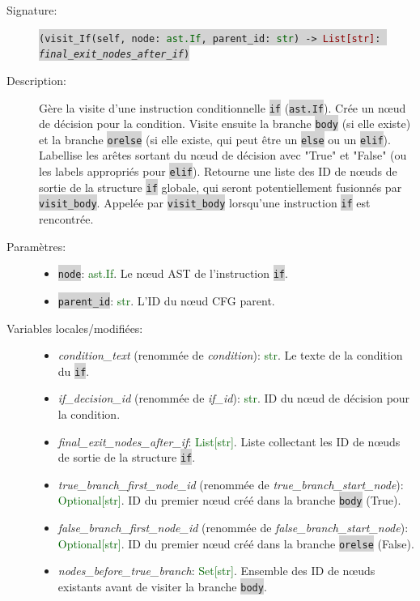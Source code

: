 \documentclass[11pt,a4paper]{article}
\newcommand{\code}[1]{\colorbox{lightgray}{\texttt{\small #1}}}
\newcommand{\var}[1]{\textit{#1}}
\newcommand{\vartype}[1]{\textcolor{darkgreen}{#1}}
\newcommand{\param}[1]{\code{#1}}
\newcommand{\rettype}[1]{\textcolor{darkred}{#1}}
\begin{document}
\begin{description}
    \item[Signature:] \code{(visit\_If(self, node: \vartype{ast.If}, parent\_id: \vartype{str}) -> \rettype{List[str]}: \var{final\_exit\_nodes\_after\_if})}
    \item[Description:] Gère la visite d'une instruction conditionnelle \code{if} (\code{ast.If}). Crée un nœud de décision pour la condition. Visite ensuite la branche \code{body} (si elle existe) et la branche \code{orelse} (si elle existe, qui peut être un \code{else} ou un \code{elif}). Labellise les arêtes sortant du nœud de décision avec "True" et "False" (ou les labels appropriés pour \code{elif}). Retourne une liste des ID de nœuds de sortie de la structure \code{if} globale, qui seront potentiellement fusionnés par \code{visit\_body}. Appelée par \code{visit\_body} lorsqu'une instruction \code{if} est rencontrée.
    \item[Paramètres:]
    \begin{itemize}
        \item \param{node}: \vartype{ast.If}. Le nœud AST de l'instruction \code{if}.
        \item \param{parent\_id}: \vartype{str}. L'ID du nœud CFG parent.
    \end{itemize}
    \item[Variables locales/modifiées:]
    \begin{itemize}
        \item \var{condition\_text} (renommée de \var{condition}): \vartype{str}. Le texte de la condition du \code{if}.
        \item \var{if\_decision\_id} (renommée de \var{if\_id}): \vartype{str}. ID du nœud de décision pour la condition.
        \item \var{final\_exit\_nodes\_after\_if}: \vartype{List[str]}. Liste collectant les ID de nœuds de sortie de la structure \code{if}.
        \item \var{true\_branch\_first\_node\_id} (renommée de \var{true\_branch\_start\_node}): \vartype{Optional[str]}. ID du premier nœud créé dans la branche \code{body} (True).
        \item \var{false\_branch\_first\_node\_id} (renommée de \var{false\_branch\_start\_node}): \vartype{Optional[str]}. ID du premier nœud créé dans la branche \code{orelse} (False).
        \item \var{nodes\_before\_true\_branch}: \vartype{Set[str]}. Ensemble des ID de nœuds existants avant de visiter la branche \code{body}.

\end{itemize}
\end{description}
\end{document}
